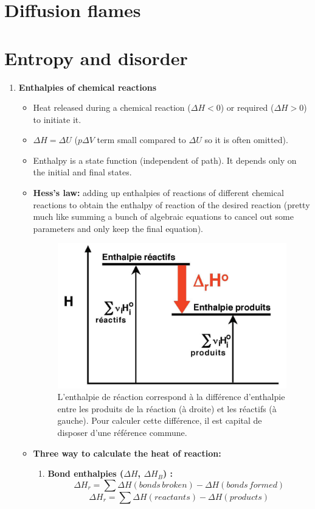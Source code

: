\documentclass[a4paper,11pt]{article}
\begin{document}
\section{Diffusion flames}
\pagebreak
\appendix
\section{Entropy and disorder}
\begin{enumerate}
\item \textbf{Enthalpies of chemical reactions}
\noindent    
\begin{itemize}
\[\Delta H = H_f - H_i \]
\item Heat released during a chemical reaction ($\Delta H<0$) or required ($\Delta H>0$) to initiate it.
\item $\Delta H = \Delta U$ ($p \Delta V$ term small compared to $\Delta U$ so it is often omitted).
\item Enthalpy is a state function (independent of path). It depends only on the initial and final states.
\item \textbf{Hess's law:} adding up enthalpies of reactions of different chemical reactions to obtain the enthalpy of reaction of the desired reaction (pretty much like summing a bunch of algebraic equations to cancel out some parameters and only keep the final equation).
\begin{figure}[h]
\centering                \includegraphics[width=.4\linewidth]{figures/EtatRefEnthalpie.jpeg}
\caption{L'enthalpie de réaction correspond à la différence d'enthalpie entre les produits de la réaction (à droite) et les réactifs (à gauche). Pour calculer cette différence, il est capital de disposer d'une référence commune.}
\end{figure}
\item \textbf{Three way to calculate the heat of reaction:}
\begin{enumerate}
    \item \textbf{Bond enthalpies ($\Delta H$, $\Delta H_B$) :} 
    \[\Delta H_r = \sum \Delta H(bonds \,broken) - \Delta H(bonds\, formed)\]
    \[\Delta H_r = \sum \Delta H(reactants) - \Delta H(products)\]
    

\end{enumerate}
\end{itemize}
\end{enumerate}
\end{document}
